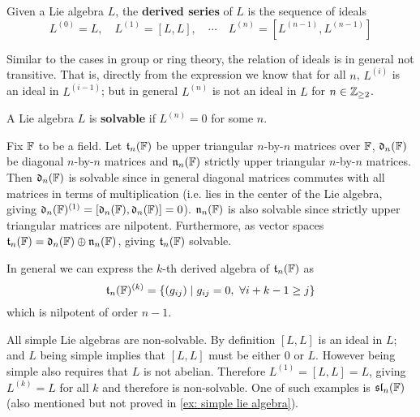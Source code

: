 \documentclass{article}
\begin{document}
\begin{definition}\label{def: derived series}
    Given a Lie algebra $L$, the \textbf{derived series} of $L$ is the sequence of ideals
    \[
        L^{(0)} = L, \quad L^{(1)} = [L, L], \quad \cdots \quad L^{(n)} = [L^{(n-1)}, L^{(n-1)}]
    \]
\end{definition}
\nogap
\begin{remark}
    Similar to the cases in group or ring theory, the relation of ideals is in general not transitive. That is, directly from the expression we know that for all $n$, $L^{(i)}$ is an ideal in $L^{(i-1)}$; but in general $L^{(n)}$ is not an ideal in $L$ for $n \in \mathbb{Z}_{\geq 2}$.
\end{remark}
\nogap
\begin{definition}[Solvable]
    A Lie algebra $L$ is \textbf{solvable} if $L^{(n)} = 0$ for some $n$.
\end{definition}

\begin{example}\label{ex: derived series}
    Fix $\mathbb{F}$ to be a field. Let $\mathfrak{t}_n(\mathbb{F})$ be upper triangular $n$-by-$n$ matrices over $\mathbb{F}$, $\mathfrak{d}_n(\mathbb{F})$ be diagonal $n$-by-$n$ matrices and $\mathfrak{n}_n(\mathbb{F})$ strictly upper triangular $n$-by-$n$ matrices. Then $\mathfrak{d}_n(\mathbb{F})$ is solvable since in general diagonal matrices commutes with all matrices in terms of multiplication (i.e. lies in the center of the Lie algebra, giving $\mathfrak{d}_n(\mathbb{F})^{(1)} = [\mathfrak{d}_n(\mathbb{F}), \mathfrak{d}_n(\mathbb{F})] = 0$). $\mathfrak{n}_n(\mathbb{F})$ is also solvable since strictly upper triangular matrices are nilpotent. Furthermore, as vector spaces $\mathfrak{t}_n(\mathbb{F}) = \mathfrak{d}_n(\mathbb{F}) \oplus \mathfrak{n}_n(\mathbb{F})$, giving $\mathfrak{t}_n(\mathbb{F})$ solvable.

    In general we can express the $k$-th derived algebra of $\mathfrak{t}_n(\mathbb{F})$ as
    \[
        \mathfrak{t}_n(\mathbb{F})^{(k)} = \{ (g_{ij}) \mid g_{ij} = 0,\ \forall i + k - 1 \geq j \}
    \]
    which is nilpotent of order $n-1$.
\end{example}
\nogap
\begin{example}
    All simple Lie algebras are non-solvable. By definition $[L, L]$ is an ideal in $L$; and $L$ being simple implies that $[L, L]$ must be either 0 or $L$. However being simple also requires that $L$ is not abelian. Therefore $L^{(1)} = [L, L] = L$, giving $L^{(k)} = L$ for all $k$ and therefore is non-solvable. One of such examples is $\mathfrak{sl}_n(\mathbb{F})$ (also mentioned but not proved in \ref{ex: simple lie algebra}).
\end{example}
\end{document}
